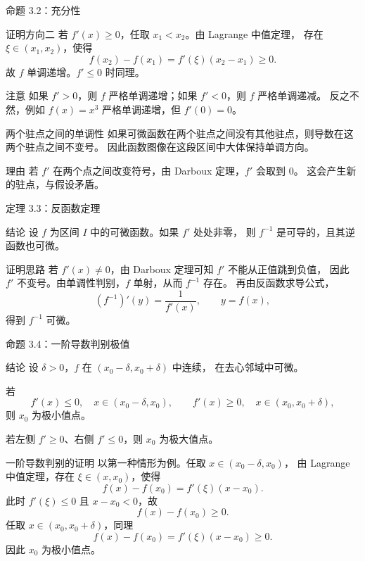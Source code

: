 \documentclass[aspectratio=169,10pt]{ctexbeamer}
\begin{document}
\begin{frame}{命题 3.2：充分性}
\small
\begin{block}{证明方向二}
若 $f'(x)\ge0$，任取 $x_1<x_2$。由 Lagrange 中值定理，
存在 $\xi\in(x_1,x_2)$，使得
\[
  f(x_2)-f(x_1)=f'(\xi)(x_2-x_1)\ge0.
\]
故 $f$ 单调递增。$f'\le0$ 时同理。
\end{block}
\begin{alertblock}{注意}
如果 $f'>0$，则 $f$ 严格单调递增；如果 $f'<0$，则 $f$ 严格单调递减。
反之不然，例如 $f(x)=x^3$ 严格单调递增，但 $f'(0)=0$。
\end{alertblock}
\end{frame}

\begin{frame}{两个驻点之间的单调性}
\small
如果可微函数在两个驻点之间没有其他驻点，则导数在这两个驻点之间不变号。
因此函数图像在这段区间中大体保持单调方向。

\begin{block}{理由}
若 $f'$ 在两个点之间改变符号，由 Darboux 定理，$f'$ 会取到 $0$。
这会产生新的驻点，与假设矛盾。
\end{block}
\end{frame}

\begin{frame}{定理 3.3：反函数定理}
\small
\begin{block}{结论}
设 $f$ 为区间 $I$ 中的可微函数。如果 $f'$ 处处非零，
则 $f^{-1}$ 是可导的，且其逆函数也可微。
\end{block}
\begin{block}{证明思路}
若 $f'(x)\ne0$，由 Darboux 定理可知 $f'$ 不能从正值跳到负值，
因此 $f'$ 不变号。由单调性判别，$f$ 单射，从而 $f^{-1}$ 存在。
再由反函数求导公式，
\[
  (f^{-1})'(y)=\frac1{f'(x)},\qquad y=f(x),
\]
得到 $f^{-1}$ 可微。
\end{block}
\end{frame}

\begin{frame}{命题 3.4：一阶导数判别极值}
\small
\begin{block}{结论}
设 $\delta>0$，$f$ 在 $(x_0-\delta,x_0+\delta)$ 中连续，
在去心邻域中可微。

若
\[
  f'(x)\le0,\quad x\in(x_0-\delta,x_0),
  \qquad
  f'(x)\ge0,\quad x\in(x_0,x_0+\delta),
\]
则 $x_0$ 为极小值点。

若左侧 $f'\ge0$、右侧 $f'\le0$，则 $x_0$ 为极大值点。
\end{block}
\end{frame}

\begin{frame}{一阶导数判别的证明}
\small
以第一种情形为例。任取 $x\in(x_0-\delta,x_0)$，
由 Lagrange 中值定理，存在 $\xi\in(x,x_0)$，使得
\[
  f(x)-f(x_0)=f'(\xi)(x-x_0).
\]
此时 $f'(\xi)\le0$ 且 $x-x_0<0$，故
\[
  f(x)-f(x_0)\ge0.
\]
任取 $x\in(x_0,x_0+\delta)$，同理
\[
  f(x)-f(x_0)=f'(\xi)(x-x_0)\ge0.
\]
因此 $x_0$ 为极小值点。
\end{frame}
\end{document}
